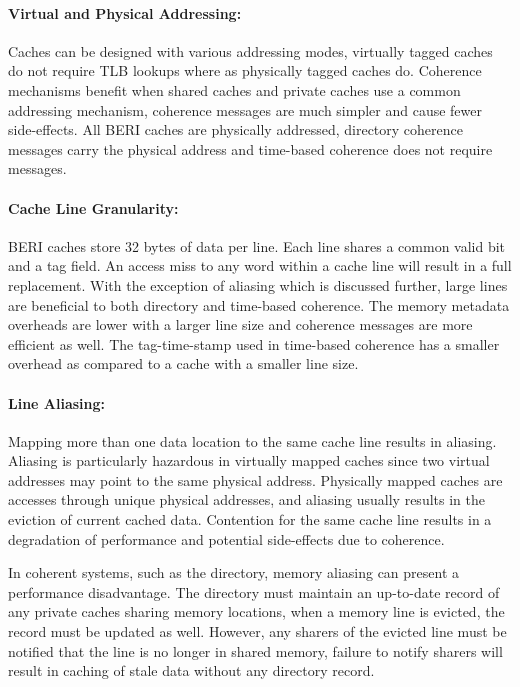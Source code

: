 	\paragraph{Virtual and Physical Addressing:} Caches can be designed with various addressing modes, virtually tagged caches do not require TLB lookups where as physically tagged caches do. Coherence mechanisms benefit when shared caches and private caches use a common addressing mechanism, coherence messages are much simpler and cause fewer side-effects. All BERI caches are physically addressed, directory coherence messages carry the physical address and time-based coherence does not require messages.
	
	\paragraph{Cache Line Granularity:} BERI caches store 32 bytes of data per line. Each line shares a common valid bit and a tag field. An access miss to any word within a cache line will result in a full replacement. With the exception of aliasing which is discussed further, large lines are beneficial to both directory and time-based coherence. The memory metadata overheads are lower with a larger line size and coherence messages are more efficient as well. The tag-time-stamp used in time-based coherence has a smaller overhead as compared to a cache with a smaller line size. 
	
	\paragraph{Line Aliasing:} Mapping more than one data location to the same cache line results in aliasing. Aliasing is particularly hazardous in virtually mapped caches since two virtual addresses may point to the same physical address. Physically mapped caches are accesses through unique physical addresses, and aliasing usually results in the eviction of current cached data. Contention for the same cache line results in a degradation of performance and potential side-effects due to coherence.
	
	In coherent systems, such as the directory, memory aliasing can present a performance disadvantage. The directory must maintain an up-to-date record of any private caches sharing memory locations, when a memory line is evicted, the record must be updated as well. However, any sharers of the evicted line must be notified that the line is no longer in shared memory, failure to notify sharers will result in caching of stale data without any directory record. 
	
